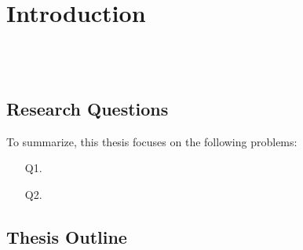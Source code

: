 \section{Introduction}
\lipsum[1] \\

\lipsum[2] \\

\lipsum[14]

\subsection{Research Questions}

To summarize, this thesis focuses on the following problems:


\begin{itemize}[leftmargin=0.85in]
    \item[Q1.  ] \lipsum[1][1] \\\lipsum[1][2]
    \item[Q2.  ] \lipsum[1][1] \\\lipsum[1][2]
\end{itemize}

\subsection{Thesis Outline}